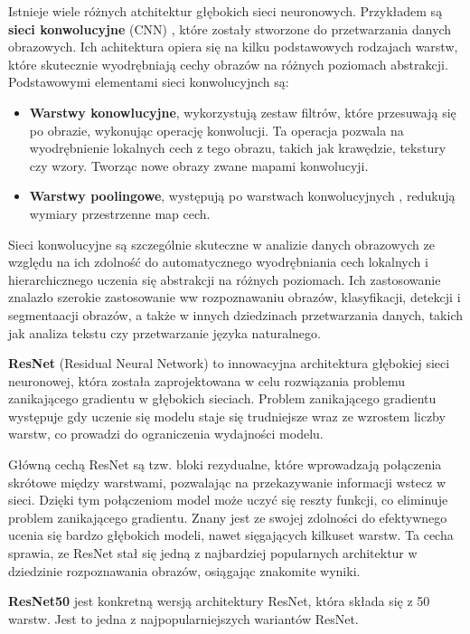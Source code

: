 Istnieje wiele różnych atchitektur głębokich sieci neuronowych.
Przykładem są \textbf{sieci konwolucyjne} \cite{8379889} (CNN) , które zostały stworzone do przetwarzania danych obrazowych.
Ich achitektura opiera się na kilku podstawowych rodzajach warstw, które skutecznie wyodrębniają cechy obrazów na różnych poziomach abstrakcji.
Podstawowymi elementami sieci konwolucyjnch są:
\begin{itemize}
	\item \textbf{Warstwy konowlucyjne}, wykorzystują zestaw filtrów, które przesuwają się po obrazie, wykonując operację konwolucji.
	      Ta operacja pozwala na wyodrębnienie lokalnych cech z tego obrazu, takich jak krawędzie, tekstury czy wzory.
	      Tworząc nowe obrazy zwane mapami konwolucyji.
	\item \textbf{Warstwy poolingowe}, występują po warstwach konwolucyjnych , redukują wymiary przestrzenne map cech.
\end{itemize}
Sieci konwolucyjne są szczególnie skuteczne w analizie danych obrazowych ze względu na ich zdolność do automatycznego wyodrębniania cech lokalnych i hierarchicznego uczenia się abstrakcji na różnych poziomach.
Ich zastosowanie znalazło szerokie zastosowanie ww rozpoznawaniu obrazów, klasyfikacji, detekcji i segmentaacji obrazów, a także w innych dziedzinach przetwarzania danych, takich jak analiza tekstu czy przetwarzanie języka naturalnego.

\textbf{ResNet} \cite{He_2016_CVPR} (Residual Neural Network) to innowacyjna architektura głębokiej sieci neuronowej, która została zaprojektowana w celu rozwiązania problemu zanikającego gradientu w głębokich sieciach.
Problem zanikającego gradientu występuje gdy uczenie się modelu staje się trudniejsze wraz ze wzrostem liczby warstw, co prowadzi do ograniczenia wydajności modelu.

Główną cechą ResNet są tzw. bloki rezydualne, które wprowadzają połączenia skrótowe między warstwami, pozwalając na przekazywanie informacji wstecz w sieci.
Dzięki tym połączeniom model może uczyć się reszty funkcji, co eliminuje problem zanikającego gradientu.
Znany jest ze swojej zdolności do efektywnego ucenia się bardzo głębokich modeli, nawet sięgających kilkuset warstw.
Ta cecha sprawia, ze ResNet stał się jedną z najbardziej popularnych architektur w dziedzinie rozpoznawania obrazów, osiągając znakomite wyniki.

\textbf{ResNet50} jest konkretną wersją architektury ResNet, która składa się z 50 warstw.
Jest to jedna z najpopularniejszych wariantów ResNet.

